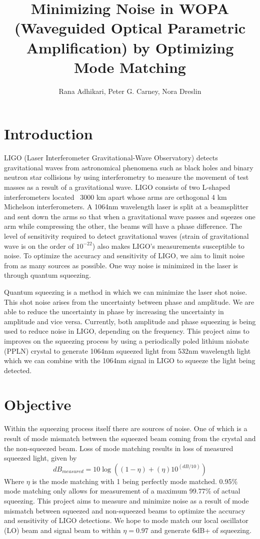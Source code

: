 \documentclass[colorlinks=true,pdfstartview=FitV,linkcolor=blue,
citecolor=red,urlcolor=magenta]{ligodoc}
\title{Minimizing Noise in WOPA (Waveguided Optical Parametric Amplification) by Optimizing Mode Matching}
\author{Rana Adhikari, Peter G. Carney, Nora Dreslin}
\begin{document}
\tableofcontents

\newpage
\section{Introduction}
LIGO (Laser Interferometer Gravitational-Wave Observatory) detects gravitational waves from astronomical phenomena such as black holes and binary neutron star collisions by using interferometry to measure the movement of test masses as a result of a gravitational wave. LIGO consists of two L-shaped interferometers located ~3000 km apart whose arms are orthogonal 4 km Michelson interferometers. A 1064nm wavelength laser is split at a beamsplitter and sent down the arms so that when a gravitational wave passes and sqeezes one arm while compressing the other, the beams will have a phase difference. The level of sensitivity required to detect gravitational waves (strain of gravitational wave is on the order of $10^{-22}$) also makes LIGO's measurements susceptible to noise. To optimize the accuracy and sensitivity of LIGO, we aim to limit noise from as many sources as possible. One way noise is minimized in the laser is through quantum squeezing. 

Quantum squeezing is a method in which we can minimize the laser shot noise. This shot noise arises from the uncertainty between phase and amplitude. We are able to reduce the uncertainty in phase by increasing the uncertainty in amplitude and vice versa. Currently, both amplitude and phase squeezing is being used to reduce noise in LIGO, depending on the frequency. This project aims to improves on the squeezing process by using a periodically poled lithium niobate (PPLN) crystal to generate 1064nm squeezed light from 532nm wavelength light which we can combine with the 1064nm signal in LIGO to squeeze the light being detected. 
\section{Objective}
Within the squeezing process itself there are sources of noise. One of which is a result of mode mismatch between the squeezed beam coming from the crystal and the non-squeezed beam. Loss of mode matching results in loss of measured squeezed light, given by
$$dB_{measured} = 10\log((1-\eta) + (\eta)10^{(dB/10)})$$
Where $\eta$ is the mode matching with 1 being perfectly mode matched. 0.95\% mode matching only allows for measurement of a maximum 99.77\% of actual squeezing. This project aims to measure and minimize noise as a result of mode mismatch between squeezed and non-squeezed beams to optimize the accuracy and sensitivity of LIGO detections.
We hope to mode match our local oscillator (LO) beam and signal beam to within $\eta=0.97$ and generate 6dB+ of squeezing.
\end{document}
